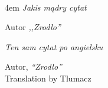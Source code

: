 \documentclass[11pt, a4paper, twoside]{Thesis} %
\title{\ttitle} %
\begin{document}

\frontmatter %

\fancyhead{} %
\fancyhead[LE,RO]{\thepage} %
\fancyhead[LO,RE]{} %

\pagestyle{fancy} %

\newcommand{\HRule}{\rule{\linewidth}{0.5mm}} %



\hypersetup{pdfsubject=\subjectname}
\hypersetup{pdfauthor=\authornames}
\hypersetup{pdfkeywords=\keywordnames}

\maketitle

\clearpage %


\cleardoublepage %
\thispagestyle{plain}
\ \\[0.3\textheight]
\begingroup
{}
\leftskip4em
\textit{\phantom{aaaa} Jakis mądry cytat}
\begin{flushright}
  Autor \textit{,,Zrodlo''}  
\end{flushright}

\vfill

\textit{Ten sam cytat po angielsku}
\begin{flushright}
  Autor, \textit{``Zrodlo''}\\
  Translation by Tlumacz
\end{flushright}
\par
\endgroup
\vfill
\end{document}
